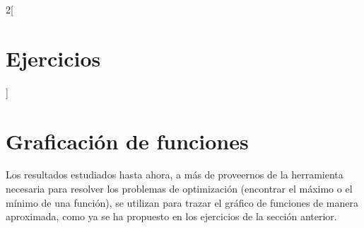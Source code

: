 \begin{multicols}{2}[\section{Ejercicios}]
\begin{enumerate}[leftmargin=*]
%
\end{enumerate}
\endgroup
\end{multicols}

\section{Graficación de funciones}
Los resultados estudiados hasta ahora, a más de proveernos de la herramienta necesaria para
resolver los problemas de optimización (encontrar el máximo o el mínimo de una función), se
utilizan para trazar el gráfico de funciones de manera aproximada, como ya se ha propuesto en los
ejercicios de la sección anterior.

